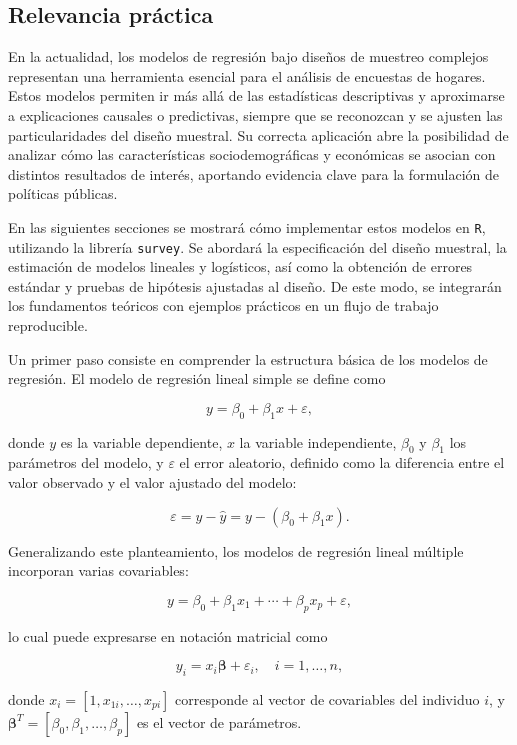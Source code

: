 \documentclass[
  spanish,
  12pt,
]{book}
\begin{document}
\subsection{Relevancia práctica}\label{relevancia-pruxe1ctica}

En la actualidad, los modelos de regresión bajo diseños de muestreo complejos representan una herramienta esencial para el análisis de encuestas de hogares. Estos modelos permiten ir más allá de las estadísticas descriptivas y aproximarse a explicaciones causales o predictivas, siempre que se reconozcan y se ajusten las particularidades del diseño muestral. Su correcta aplicación abre la posibilidad de analizar cómo las características sociodemográficas y económicas se asocian con distintos resultados de interés, aportando evidencia clave para la formulación de políticas públicas.

En las siguientes secciones se mostrará cómo implementar estos modelos en \texttt{R}, utilizando la librería \texttt{survey}. Se abordará la especificación del diseño muestral, la estimación de modelos lineales y logísticos, así como la obtención de errores estándar y pruebas de hipótesis ajustadas al diseño. De este modo, se integrarán los fundamentos teóricos con ejemplos prácticos en un flujo de trabajo reproducible.

Un primer paso consiste en comprender la estructura básica de los modelos de regresión. El modelo de regresión lineal simple se define como

\[
y = \beta_{0} + \beta_{1}x + \varepsilon,
\]

donde \(y\) es la variable dependiente, \(x\) la variable independiente, \(\beta_{0}\) y \(\beta_{1}\) los parámetros del modelo, y \(\varepsilon\) el error aleatorio, definido como la diferencia entre el valor observado y el valor ajustado del modelo:

\[
\varepsilon = y - \hat{y} = y - (\beta_{0} + \beta_{1}x).
\]

Generalizando este planteamiento, los modelos de regresión lineal múltiple incorporan varias covariables:

\[
y = \beta_{0} + \beta_{1}x_{1} + \cdots + \beta_{p}x_{p} + \varepsilon,
\]

lo cual puede expresarse en notación matricial como

\[
y_{i} = x_{i}\boldsymbol{\beta} + \varepsilon_{i}, \quad i=1,\ldots,n,
\]

donde \(x_{i} = [1, x_{1i}, \ldots, x_{pi}]\) corresponde al vector de covariables del individuo \(i\), y \(\boldsymbol{\beta}^{T} = [\beta_{0}, \beta_{1}, \ldots, \beta_{p}]\) es el vector de parámetros.
\end{document}
